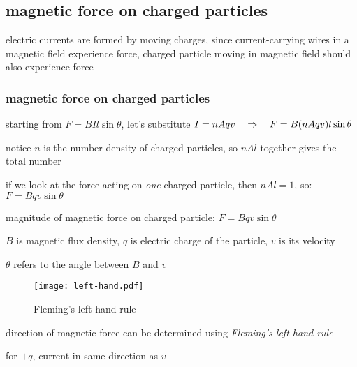 






\subsection{magnetic force on charged particles}

electric currents are formed by moving charges, since current-carrying wires in a magnetic field experience force, charged particle moving in magnetic field should also experience force

\subsubsection{magnetic force on charged particles}

starting from $F=BIl\sin\theta$, let's substitute $I=nAqv \quad \Rightarrow \quad F=B(nAqv)l\sin\theta$

notice $n$ is the number density of charged particles, so $nAl$ together gives the total number

if we look at the force acting on \emph{one} charged particle, then $nAl=1$, so: $F=Bqv\sin\theta$

\cmt magnitude of magnetic force on charged particle: $\boxed{F=Bqv\sin\theta}$ 

$B$ is magnetic flux density, $q$ is electric charge of the particle, $v$ is its velocity

$\theta$ refers to the angle between $B$ and $v$

\begin{wrapfigure}{r}{0.45\textwidth}
	\vspace*{-16pt}
	\centering
	\texttt{[image: left-hand.pdf]}
	
	Fleming's left-hand rule
	\vspace*{-16pt}
\end{wrapfigure}

\cmt direction of magnetic force can be determined using \emph{Fleming's left-hand rule}

for $+q$, current in same direction as $v$

